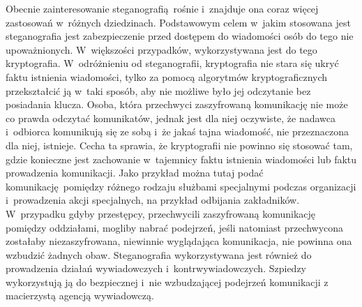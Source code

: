 \documentclass[a4paper, twoside, 12pt]{report}
\begin{document}
        Obecnie zainteresowanie steganografią rośnie i~znajduje ona coraz więcej
        zastosowań w~różnych dziedzinach. Podstawowym celem w~jakim stosowana jest
        steganografia jest zabezpieczenie przed dostępem do wiadomości osób do tego nie
        upoważnionych. W~większości przypadków, wykorzystywana jest do tego
        kryptografia. W~odróżnieniu od steganografii, kryptografia nie stara się
        ukryć faktu istnienia wiadomości, tylko za pomocą algorytmów kryptograficznych
        przekształcić ją w~taki sposób, aby nie możliwe było jej odczytanie bez posiadania
        klucza. Osoba, która przechwyci zaszyfrowaną komunikację nie może co prawda
        odczytać komunikatów, jednak jest dla niej oczywiste, że nadawca i~odbiorca
        komunikują się ze sobą i~że jakaś tajna wiadomość, nie przeznaczona dla niej,
        istnieje\cite{DIGITALWATERMARKING}. Cecha ta sprawia, że kryptografii nie
        powinno się stosować tam, gdzie konieczne jest zachowanie w~tajemnicy
        faktu istnienia wiadomości lub faktu prowadzenia komunikacji. Jako przykład
        można tutaj podać komunikację pomiędzy różnego rodzaju służbami specjalnymi
        podczas organizacji i~prowadzenia akcji specjalnych, na przykład odbijania zakładników.
        W~przypadku gdyby przestępcy, przechwycili zaszyfrowaną komunikację
        pomiędzy oddziałami, mogliby nabrać podejrzeń, jeśli natomiast przechwycona
        zostałaby niezaszyfrowana, niewinnie wyglądająca komunikacja, nie powinna ona
        wzbudzić żadnych obaw. Steganografia wykorzystywana jest również do prowadzenia
        działań wywiadowczych i~kontrwywiadowczych. Szpiedzy wykorzystują ją do
        bezpiecznej i~nie wzbudzającej podejrzeń komunikacji z macierzystą agencją
        wywiadowczą.
\end{document}
